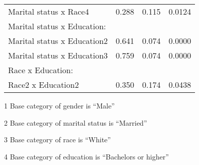 \begin{table}[H]
\begin{threeparttable}
\begin{tabular}{lrcr}
  \hspace{5pt}   Marital status x Race4 		& 0.288		& 0.115 & 0.0124 \\ 
Marital status x Education: & & & \\
  \hspace{5pt}   Marital status x Education2 		& 0.641		& 0.074 & 0.0000 \\ 
  \hspace{5pt}   Marital status x Education3 		& 0.759		& 0.074 & 0.0000 \\ 
Race x Education: & & & \\
  \hspace{5pt}   Race2 x Education2 			& 0.350		& 0.174 & 0.0438 \\ 
  \hline
\end{tabular}
\begin{tablenotes}\footnotesize
\item[1] Base category of gender is ``Male''
\item[2] Base category of marital status is ``Married''
\item[3] Base category of race is ``White''
\item[4] Base category of education is ``Bachelors or higher''
\end{tablenotes}
\end{threeparttable}
\label{tab:Table3Reg}
\end{table}


